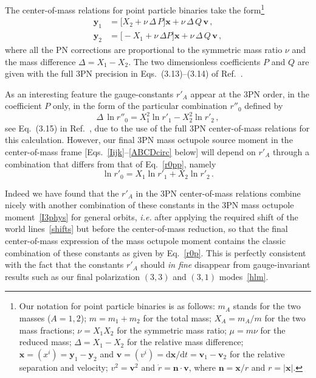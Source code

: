 \documentclass[prd,preprint,superscriptaddress,tightenlines,nofootinbib,
  eqsecnum,showpacs]{revtex4}
\newcommand{\ud}{\mathrm{d}}
\begin{document}
The center-of-mass relations for point particle binaries take the
form\footnote{Our notation for point particle binaries is as follows:
  $m_A$ stands for the two masses ($A=1,2$); $m = m_1+m_2$ for the
  total mass; $X_A=m_A/m$ for the two mass fractions; $\nu = X_1X_2$
  for the symmetric mass ratio; $\mu = m\nu$ for the reduced mass;
  $\Delta = X_1-X_2$ for the relative mass difference; $\bm{x}=(x^i) =
  \bm{y}_1 - \bm{y}_2$ and $\bm{v} = (v^i) = \ud \bm{x}/\ud t =
  \bm{v}_1-\bm{v}_2$ for the relative separation and velocity;
  $v^2=\bm{v}^2$ and $\dot{r}=\bm{n}\cdot\bm{v}$, where
  $\bm{n}=\bm{x}/r$ and $r=\vert\bm{x}\vert$.}
%
\begin{subequations}\label{y12i}
\begin{align}
\bm{y}_1 &= \Big[X_2+\nu\,\Delta\,P\Big] \bm{x} +
\nu\,\Delta\,Q\,\bm{v} \,,\\ \bm{y}_2 &= \Big[-X_1+\nu\,\Delta P\Big]
\bm{x} +\nu\,\Delta\,Q\,\bm{v} \,,
\end{align}\end{subequations}
%
where all the PN corrections are proportional to the symmetric mass
ratio $\nu$ and the mass difference $\Delta=X_1-X_2$. The two
dimensionless coefficients $P$ and $Q$ are given with the full 3PN
precision in Eqs.~(3.13)--(3.14) of Ref.~\cite{BI03CM}.

As an interesting feature the gauge-constants $r'_A$ appear at the 3PN
order, in the coefficient $P$ only, in the form of the particular
combination $r''_0$ defined by
%
\begin{equation}\label{r0pp}
\Delta\,\ln r''_0 = X_1^2 \ln r'_1 - X_2^2 \ln r'_2\,,
\end{equation}
%
see Eq.~(3.15) in Ref.~\cite{BI03CM}, due to the use of the full 3PN
center-of-mass relations for this calculation. However, our final 3PN
mass octupole source moment in the center-of-mass frame
[Eqs.~\eqref{Iijk}--\eqref{ABCDcirc} below] will depend on $r'_A$
through a combination that differs from that of Eq.~\eqref{r0pp},
namely
%
\begin{equation}\label{r0p}
\ln r'_0 = X_1 \ln r'_1 + X_2 \ln r'_2\,.
\end{equation}
%

Indeed we have found that the $r'_A$ in the 3PN center-of-mass
relations combine nicely with another combination of these constants
in the 3PN mass octupole moment~\eqref{I3phys} for general orbits,
\textit{i.e.} after applying the required shift of the world
lines~\eqref{shifts} but before the center-of-mass reduction, so that
the final center-of-mass expression of the mass octupole moment
contains the classic combination of these constants as given by
Eq.~\eqref{r0p}. This is perfectly consistent with the fact that the
constants $r'_A$ should \textit{in fine} disappear from
gauge-invariant results such as our final polarization $(3,3)$ and
$(3,1)$ modes~\eqref{hlm}.
\end{document}
